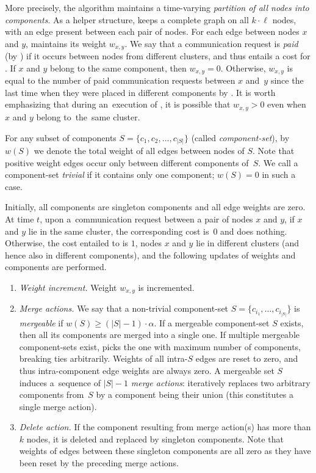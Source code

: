 More precisely, the algorithm maintains a time-varying \emph{partition of all
nodes into components}. As a helper structure, \CREP keeps a complete graph on
all $k \cdot \ell$ nodes, with an edge present between each pair of nodes. For
each edge between nodes $x$ and $y$, \CREP maintains its weight $w_{x,y}$. We
say that a communication request is \emph{paid} (by \CREP) if it occurs
between nodes from different clusters, and thus entails a cost for \CREP. If
$x$ and $y$ belong to the same component, then $w_{x,y} = 0$. Otherwise,
$w_{x,y}$ is equal to the number of paid communication requests between $x$
and~$y$ since the last time when they were placed in different components by
\CREP. It is worth emphasizing that during an~execution of \CREP, it is
possible that $w_{x,y} > 0$ even when $x$ and $y$ belong to~the~same cluster.

For any subset of components $S = \{ c_1, c_2, \ldots, c_{|S|} \}$ (called
\emph{component-set}), by $w(S)$ we denote the total weight of all edges
between nodes of $S$. Note that positive weight edges occur only between
different components of~$S$. We call a component-set \emph{trivial} if it
contains only one component; $w(S) = 0$ in such a case.

Initially, all components are singleton components and all edge weights are
zero. At time $t$, upon a~communication request between a pair of nodes $x$
and $y$, if $x$ and $y$ lie in the same cluster, the corresponding cost is~$0$
and \CREP does nothing. Otherwise, the cost entailed to \CREP is $1$, nodes
$x$ and $y$ lie in different clusters (and hence also in different
components), and the following updates of weights and components are
performed.

\begin{enumerate}

\item \emph{Weight increment.} Weight $w_{x,y}$ is incremented.

\item \emph{Merge actions.} We say that a non-trivial component-set $S = \{
c_{i_1}, \ldots, c_{i_{|S|}} \}$ is \emph{mergeable} if $w(S) \geq
(|S|-1) \cdot \alpha$. If a mergeable component-set $S$ exists, then all its
components are merged into a single one. If multiple mergeable component-sets
exist, \CREP picks the one with maximum number of components, breaking ties
arbitrarily. Weights of all intra-$S$ edges are reset to zero, and thus
intra-component edge weights are always zero. A mergeable set $S$ induces
a~sequence of $|S|-1$ \emph{merge actions}:
\CREP iteratively replaces two arbitrary components 
from~$S$ by a component being their union (this constitutes a single merge
action).

\item \emph{Delete action.} If the component resulting from merge action(s)
has more than $k$ nodes, it is deleted and replaced by singleton
components. Note that weights of edges between these singleton components are
all zero as they have been reset by the preceding merge actions.

\end{enumerate}

